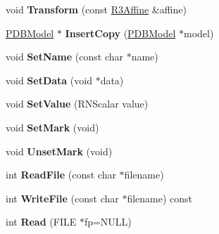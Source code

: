 \begin{DoxyCompactItemize}
\item 
void {\bfseries Transform} (const \hyperlink{class_r3_affine}{R3\+Affine} \&affine)\hypertarget{class_p_d_b_file_af5570348a2c8470e181cabda47f9fc03}{}\label{class_p_d_b_file_af5570348a2c8470e181cabda47f9fc03}

\item 
\hyperlink{class_p_d_b_model}{P\+D\+B\+Model} $\ast$ {\bfseries Insert\+Copy} (\hyperlink{class_p_d_b_model}{P\+D\+B\+Model} $\ast$model)\hypertarget{class_p_d_b_file_abcc7e00008b70f3822271b19dbd097de}{}\label{class_p_d_b_file_abcc7e00008b70f3822271b19dbd097de}

\item 
void {\bfseries Set\+Name} (const char $\ast$name)\hypertarget{class_p_d_b_file_accbcc84ade412ba0d686305a4bca741e}{}\label{class_p_d_b_file_accbcc84ade412ba0d686305a4bca741e}

\item 
void {\bfseries Set\+Data} (void $\ast$data)\hypertarget{class_p_d_b_file_ad1632896c5e33b8e30e9d30942761820}{}\label{class_p_d_b_file_ad1632896c5e33b8e30e9d30942761820}

\item 
void {\bfseries Set\+Value} (R\+N\+Scalar value)\hypertarget{class_p_d_b_file_afc1e2f7310a1369583efe39e0a8cb6af}{}\label{class_p_d_b_file_afc1e2f7310a1369583efe39e0a8cb6af}

\item 
void {\bfseries Set\+Mark} (void)\hypertarget{class_p_d_b_file_a51f821cfba9196a7b3a11ed5e68ecf6c}{}\label{class_p_d_b_file_a51f821cfba9196a7b3a11ed5e68ecf6c}

\item 
void {\bfseries Unset\+Mark} (void)\hypertarget{class_p_d_b_file_af87f0c23ccabeb0188a6281565fdbf2f}{}\label{class_p_d_b_file_af87f0c23ccabeb0188a6281565fdbf2f}

\item 
int {\bfseries Read\+File} (const char $\ast$filename)\hypertarget{class_p_d_b_file_ac97dca4a44ef2d4be572da40439ba301}{}\label{class_p_d_b_file_ac97dca4a44ef2d4be572da40439ba301}

\item 
int {\bfseries Write\+File} (const char $\ast$filename) const \hypertarget{class_p_d_b_file_a93346bb2002541718a57a56cb3eebdfc}{}\label{class_p_d_b_file_a93346bb2002541718a57a56cb3eebdfc}

\item 
int {\bfseries Read} (F\+I\+LE $\ast$fp=N\+U\+LL)\hypertarget{class_p_d_b_file_ac445dc762fb26154c7945852b759b94f}{}\label{class_p_d_b_file_ac445dc762fb26154c7945852b759b94f}


\end{DoxyCompactItemize}
